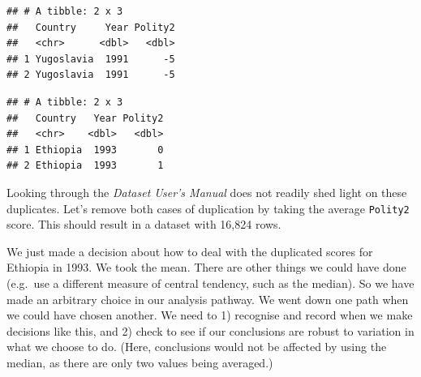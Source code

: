 \documentclass[]{book}
\newenvironment{Shaded}{\begin{snugshade}}{\end{snugshade}}
\newcommand{\DataTypeTok}[1]{\textcolor[rgb]{0.13,0.29,0.53}{#1}}
\newcommand{\DecValTok}[1]{\textcolor[rgb]{0.00,0.00,0.81}{#1}}
\newcommand{\KeywordTok}[1]{\textcolor[rgb]{0.13,0.29,0.53}{\textbf{#1}}}
\newcommand{\NormalTok}[1]{#1}
\newcommand{\OperatorTok}[1]{\textcolor[rgb]{0.81,0.36,0.00}{\textbf{#1}}}
\newcommand{\StringTok}[1]{\textcolor[rgb]{0.31,0.60,0.02}{#1}}
\begin{document}
\begin{verbatim}
## # A tibble: 2 x 3
##   Country     Year Polity2
##   <chr>      <dbl>   <dbl>
## 1 Yugoslavia  1991      -5
## 2 Yugoslavia  1991      -5
\end{verbatim}

\begin{Shaded}
\end{Shaded}

\begin{verbatim}
## # A tibble: 2 x 3
##   Country   Year Polity2
##   <chr>    <dbl>   <dbl>
## 1 Ethiopia  1993       0
## 2 Ethiopia  1993       1
\end{verbatim}

Looking through the \emph{Dataset User's Manual} does not readily shed light on these duplicates. Let's remove both cases of duplication by taking the average \texttt{Polity2} score. This should result in a dataset with 16,824 rows.

\begin{Shaded}
\end{Shaded}

\begin{warning}
We just made a decision about how to deal with the duplicated scores for
Ethiopia in 1993. We took the mean. There are other things we could have
done (e.g.~use a different measure of central tendency, such as the
median). So we have made an arbitrary choice in our analysis pathway. We
went down one path when we could have chosen another. We need to 1)
recognise and record when we make decisions like this, and 2) check to
see if our conclusions are robust to variation in what we choose to do.
(Here, conclusions would not be affected by using the median, as there
are only two values being averaged.)
\end{warning}
\end{document}
